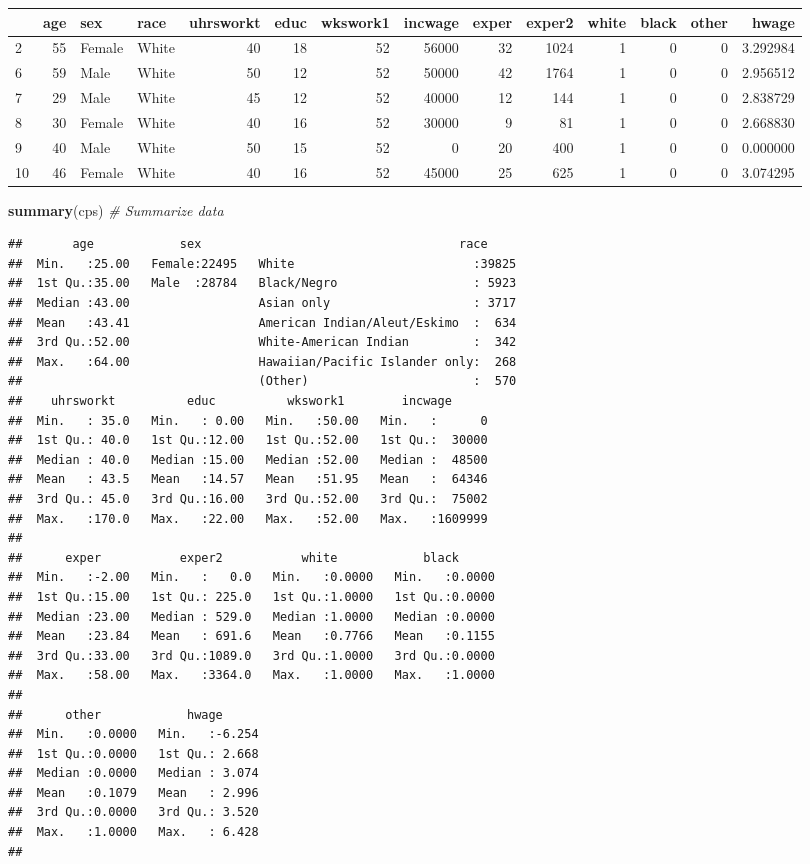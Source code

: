 \documentclass[
]{article}
\newenvironment{Shaded}{\begin{snugshade}}{\end{snugshade}}
\newcommand{\CommentTok}[1]{\textcolor[rgb]{0.56,0.35,0.01}{\textit{#1}}}
\newcommand{\KeywordTok}[1]{\textcolor[rgb]{0.13,0.29,0.53}{\textbf{#1}}}
\newcommand{\NormalTok}[1]{#1}
\begin{document}
\begin{longtable}[]{@{}lrllrrrrrrrrrr@{}}
\toprule
& age & sex & race & uhrsworkt & educ & wkswork1 & incwage & exper &
exper2 & white & black & other & hwage\tabularnewline
\midrule
\endhead
2 & 55 & Female & White & 40 & 18 & 52 & 56000 & 32 & 1024 & 1 & 0 & 0 &
3.292984\tabularnewline
6 & 59 & Male & White & 50 & 12 & 52 & 50000 & 42 & 1764 & 1 & 0 & 0 &
2.956512\tabularnewline
7 & 29 & Male & White & 45 & 12 & 52 & 40000 & 12 & 144 & 1 & 0 & 0 &
2.838729\tabularnewline
8 & 30 & Female & White & 40 & 16 & 52 & 30000 & 9 & 81 & 1 & 0 & 0 &
2.668830\tabularnewline
9 & 40 & Male & White & 50 & 15 & 52 & 0 & 20 & 400 & 1 & 0 & 0 &
0.000000\tabularnewline
10 & 46 & Female & White & 40 & 16 & 52 & 45000 & 25 & 625 & 1 & 0 & 0 &
3.074295\tabularnewline
\bottomrule
\end{longtable}

\begin{Shaded}
\begin{Highlighting}[]
\KeywordTok{summary}\NormalTok{(cps) }\CommentTok{# Summarize data}
\end{Highlighting}
\end{Shaded}

\begin{verbatim}
##       age            sex                                    race      
##  Min.   :25.00   Female:22495   White                         :39825  
##  1st Qu.:35.00   Male  :28784   Black/Negro                   : 5923  
##  Median :43.00                  Asian only                    : 3717  
##  Mean   :43.41                  American Indian/Aleut/Eskimo  :  634  
##  3rd Qu.:52.00                  White-American Indian         :  342  
##  Max.   :64.00                  Hawaiian/Pacific Islander only:  268  
##                                 (Other)                       :  570  
##    uhrsworkt          educ          wkswork1        incwage       
##  Min.   : 35.0   Min.   : 0.00   Min.   :50.00   Min.   :      0  
##  1st Qu.: 40.0   1st Qu.:12.00   1st Qu.:52.00   1st Qu.:  30000  
##  Median : 40.0   Median :15.00   Median :52.00   Median :  48500  
##  Mean   : 43.5   Mean   :14.57   Mean   :51.95   Mean   :  64346  
##  3rd Qu.: 45.0   3rd Qu.:16.00   3rd Qu.:52.00   3rd Qu.:  75002  
##  Max.   :170.0   Max.   :22.00   Max.   :52.00   Max.   :1609999  
##                                                                   
##      exper           exper2           white            black       
##  Min.   :-2.00   Min.   :   0.0   Min.   :0.0000   Min.   :0.0000  
##  1st Qu.:15.00   1st Qu.: 225.0   1st Qu.:1.0000   1st Qu.:0.0000  
##  Median :23.00   Median : 529.0   Median :1.0000   Median :0.0000  
##  Mean   :23.84   Mean   : 691.6   Mean   :0.7766   Mean   :0.1155  
##  3rd Qu.:33.00   3rd Qu.:1089.0   3rd Qu.:1.0000   3rd Qu.:0.0000  
##  Max.   :58.00   Max.   :3364.0   Max.   :1.0000   Max.   :1.0000  
##                                                                    
##      other            hwage       
##  Min.   :0.0000   Min.   :-6.254  
##  1st Qu.:0.0000   1st Qu.: 2.668  
##  Median :0.0000   Median : 3.074  
##  Mean   :0.1079   Mean   : 2.996  
##  3rd Qu.:0.0000   3rd Qu.: 3.520  
##  Max.   :1.0000   Max.   : 6.428  
## 
\end{verbatim}
\end{document}
